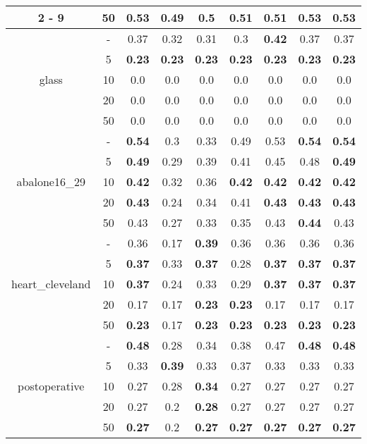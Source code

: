 \documentclass{article}%
\begin{document}
\begin{tabular}{c|c|ccccccc}
\cline{2%
-%
9}%
&50&\textbf{0.53}&0.49&0.5&0.51&0.51&\textbf{0.53}&\textbf{0.53}\\%
\hline%
\multirow{5}{*}{glass}&{-}&0.37&0.32&0.31&0.3&\textbf{0.42}&0.37&0.37\\%
\cline{2%
-%
9}%
&5&\textbf{0.23}&\textbf{0.23}&\textbf{0.23}&\textbf{0.23}&\textbf{0.23}&\textbf{0.23}&\textbf{0.23}\\%
\cline{2%
-%
9}%
&10&0.0&0.0&0.0&0.0&0.0&0.0&0.0\\%
\cline{2%
-%
9}%
&20&0.0&0.0&0.0&0.0&0.0&0.0&0.0\\%
\cline{2%
-%
9}%
&50&0.0&0.0&0.0&0.0&0.0&0.0&0.0\\%
\hline%
\multirow{5}{*}{abalone16\_29}&{-}&\textbf{0.54}&0.3&0.33&0.49&0.53&\textbf{0.54}&\textbf{0.54}\\%
\cline{2%
-%
9}%
&5&\textbf{0.49}&0.29&0.39&0.41&0.45&0.48&\textbf{0.49}\\%
\cline{2%
-%
9}%
&10&\textbf{0.42}&0.32&0.36&\textbf{0.42}&\textbf{0.42}&\textbf{0.42}&\textbf{0.42}\\%
\cline{2%
-%
9}%
&20&\textbf{0.43}&0.24&0.34&0.41&\textbf{0.43}&\textbf{0.43}&\textbf{0.43}\\%
\cline{2%
-%
9}%
&50&0.43&0.27&0.33&0.35&0.43&\textbf{0.44}&0.43\\%
\hline%
\multirow{5}{*}{heart\_cleveland}&{-}&0.36&0.17&\textbf{0.39}&0.36&0.36&0.36&0.36\\%
\cline{2%
-%
9}%
&5&\textbf{0.37}&0.33&\textbf{0.37}&0.28&\textbf{0.37}&\textbf{0.37}&\textbf{0.37}\\%
\cline{2%
-%
9}%
&10&\textbf{0.37}&0.24&0.33&0.29&\textbf{0.37}&\textbf{0.37}&\textbf{0.37}\\%
\cline{2%
-%
9}%
&20&0.17&0.17&\textbf{0.23}&\textbf{0.23}&0.17&0.17&0.17\\%
\cline{2%
-%
9}%
&50&\textbf{0.23}&0.17&\textbf{0.23}&\textbf{0.23}&\textbf{0.23}&\textbf{0.23}&\textbf{0.23}\\%
\hline%
\multirow{5}{*}{postoperative}&{-}&\textbf{0.48}&0.28&0.34&0.38&0.47&\textbf{0.48}&\textbf{0.48}\\%
\cline{2%
-%
9}%
&5&0.33&\textbf{0.39}&0.33&0.37&0.33&0.33&0.33\\%
\cline{2%
-%
9}%
&10&0.27&0.28&\textbf{0.34}&0.27&0.27&0.27&0.27\\%
\cline{2%
-%
9}%
&20&0.27&0.2&\textbf{0.28}&0.27&0.27&0.27&0.27\\%
\cline{2%
-%
9}%
&50&\textbf{0.27}&0.2&\textbf{0.27}&\textbf{0.27}&\textbf{0.27}&\textbf{0.27}&\textbf{0.27}\\%
\hline%
\end{tabular}

%
\end{document}
